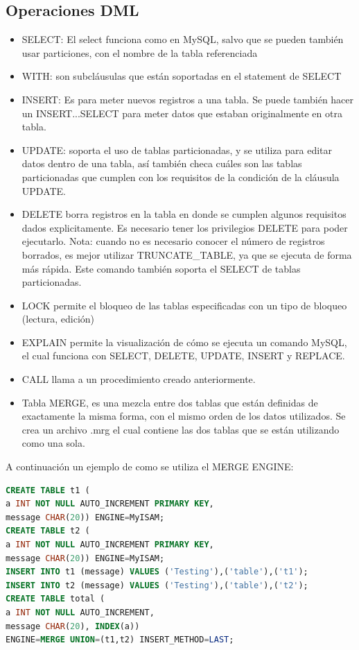 \documentclass{acmart}
\begin{document}
\subsection{Operaciones DML}
\begin{itemize}
    \item SELECT: El select funciona como en MySQL, salvo que se pueden también usar particiones, con el nombre de la tabla referenciada
    \item WITH: son subcláusulas que están soportadas en el statement de SELECT
    \item INSERT: Es para meter nuevos registros a una tabla. Se puede también hacer un INSERT...SELECT para meter datos que estaban originalmente en otra tabla.
    \item UPDATE: soporta el uso de tablas particionadas, y se utiliza para editar datos dentro de una tabla, así también checa cuáles son las tablas particionadas que cumplen con los requisitos de la condición de la cláusula UPDATE.
    \item DELETE borra registros en la tabla en donde se cumplen algunos requisitos dados explicitamente. Es necesario tener los privilegios DELETE para poder ejecutarlo. Nota: cuando no es necesario conocer el número de registros borrados, es mejor utilizar TRUNCATE\_TABLE, ya que se ejecuta de forma más rápida. Este comando también soporta el SELECT de tablas particionadas.
    \item LOCK permite el bloqueo de las tablas especificadas con un tipo de bloqueo (lectura, edición)
    \item EXPLAIN permite la visualización de cómo se ejecuta un comando MySQL, el cual funciona con SELECT, DELETE, UPDATE, INSERT y REPLACE.
    \item CALL llama a un procedimiento creado anteriormente.
    \item Tabla MERGE, es una mezcla entre dos tablas que están definidas de exactamente la misma forma, con el mismo orden de los datos utilizados. Se crea un archivo .mrg el cual contiene las dos tablas que se están utilizando como una sola.
    
\end{itemize}

A continuación un ejemplo de como se utiliza el MERGE ENGINE:
\begin{lstlisting}[language=sql]
CREATE TABLE t1 (
a INT NOT NULL AUTO_INCREMENT PRIMARY KEY,
message CHAR(20)) ENGINE=MyISAM;
CREATE TABLE t2 (
a INT NOT NULL AUTO_INCREMENT PRIMARY KEY,
message CHAR(20)) ENGINE=MyISAM;
INSERT INTO t1 (message) VALUES ('Testing'),('table'),('t1');
INSERT INTO t2 (message) VALUES ('Testing'),('table'),('t2');
CREATE TABLE total (
a INT NOT NULL AUTO_INCREMENT,
message CHAR(20), INDEX(a))
ENGINE=MERGE UNION=(t1,t2) INSERT_METHOD=LAST;
\end{lstlisting}
\end{document}
